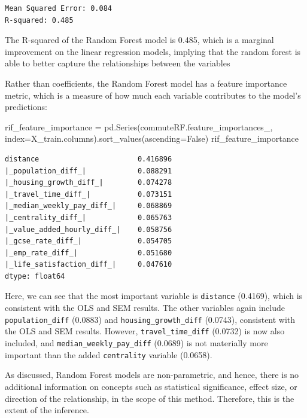 \documentclass[
  number]{elsarticle}
\newenvironment{Shaded}{\begin{snugshade}}{\end{snugshade}}
\newcommand{\NormalTok}[1]{\textcolor[rgb]{0.00,0.23,0.31}{#1}}
\newcommand{\OperatorTok}[1]{\textcolor[rgb]{0.37,0.37,0.37}{#1}}
\newcommand{\VariableTok}[1]{\textcolor[rgb]{0.07,0.07,0.07}{#1}}
\begin{document}
\begin{verbatim}
Mean Squared Error: 0.084
R-squared: 0.485
\end{verbatim}

The R-squared of the Random Forest model is 0.485, which is a marginal
improvement on the linear regression models, implying that the random
forest is able to better capture the relationships between the variables

Rather than coefficients, the Random Forest model has a feature
importance metric, which is a measure of how much each variable
contributes to the model's predictions:

\begin{Shaded}
\begin{Highlighting}[]
\NormalTok{rif\_feature\_importance }\OperatorTok{=}\NormalTok{ pd.Series(commuteRF.feature\_importances\_, index}\OperatorTok{=}\NormalTok{X\_train.columns).sort\_values(ascending}\OperatorTok{=}\VariableTok{False}\NormalTok{)}
\NormalTok{rif\_feature\_importance}
\end{Highlighting}
\end{Shaded}

\begin{verbatim}
distance                       0.416896
|_population_diff_|            0.088291
|_housing_growth_diff_|        0.074278
|_travel_time_diff_|           0.073151
|_median_weekly_pay_diff_|     0.068869
|_centrality_diff_|            0.065763
|_value_added_hourly_diff_|    0.058756
|_gcse_rate_diff_|             0.054705
|_emp_rate_diff_|              0.051680
|_life_satisfaction_diff_|     0.047610
dtype: float64
\end{verbatim}

Here, we can see that the most important variable is
\texttt{\textquotesingle{}distance\textquotesingle{}} (0.4169), which is
consistent with the OLS and SEM results. The other variables again
include \texttt{\textquotesingle{}population\_diff\textquotesingle{}}
(0.0883) and
\texttt{\textquotesingle{}housing\_growth\_diff\textquotesingle{}}
(0.0743), consistent with the OLS and SEM results. However,
\texttt{\textquotesingle{}travel\_time\_diff\textquotesingle{}} (0.0732)
is now also included, and
\texttt{\textquotesingle{}median\_weekly\_pay\_diff\textquotesingle{}}
(0.0689) is not materially more important than the added
\texttt{\textquotesingle{}centrality\textquotesingle{}} variable
(0.0658).

As discussed, Random Forest models are non-parametric, and hence, there
is no additional information on concepts such as statistical
significance, effect size, or direction of the relationship, in the
scope of this method. Therefore, this is the extent of the inference.
\end{document}

